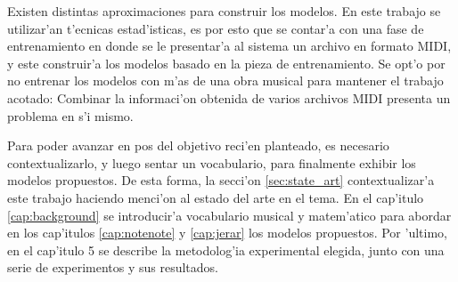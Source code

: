 Existen distintas aproximaciones para construir los modelos.  En este trabajo se utilizar'an t'ecnicas estad'isticas, es por esto que se contar'a 
con una fase de entrenamiento en donde se le presentar'a al sistema un archivo en formato MIDI, y este construir'a los modelos basado en la pieza 
de entrenamiento. Se opt'o por no entrenar los modelos con m'as de una obra musical para mantener el trabajo acotado: Combinar la informaci'on obtenida
de varios archivos MIDI presenta un problema en s'i mismo.

Para poder avanzar en pos del objetivo reci'en planteado, es necesario contextualizarlo, y luego sentar un vocabulario, para finalmente exhibir los
modelos propuestos. De esta forma, la secci'on \ref{sec:state_art} contextualizar'a este trabajo haciendo menci'on al estado del arte 
en el tema. En el cap'itulo \ref{cap:background} se introducir'a vocabulario musical y matem'atico 
para abordar en los cap'itulos \ref{cap:notenote} y \ref{cap:jerar} los modelos propuestos. Por 'ultimo, en el cap'itulo 5 se describe la metodolog'ia
experimental elegida, junto con una serie de experimentos y sus resultados.

